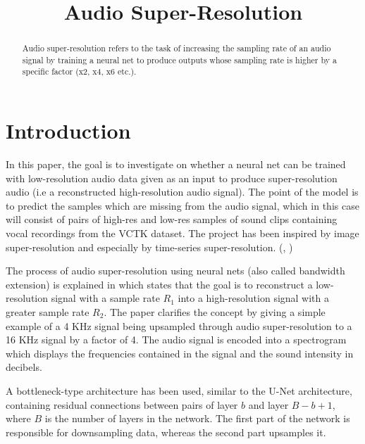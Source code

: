 \documentclass[conference]{IEEEtran}
\begin{document}
\title{Audio Super-Resolution\\
}

\author{
}

\maketitle

\begin{abstract}
Audio super-resolution refers to the task of increasing the sampling rate of an audio signal by training a neural net to produce outputs whose sampling rate is higher by a specific factor (x2, x4, x6 etc.).
\end{abstract}

\section{Introduction}
	In this paper, the goal is to investigate on whether a neural net can be trained with low-resolution audio data given as an input to produce super-resolution audio (i.e a reconstructed high-resolution audio signal). The point of the model is to predict the samples which are missing from the audio signal, which in this case will consist of pairs of high-res and low-res samples of sound clips containing vocal recordings from the VCTK dataset. The project has been inspired by image super-resolution and especially by time-series super-resolution. (\textcite{kuleshov2017audio}, \textcite{hetherly2017audio})

	The process of audio super-resolution using neural nets (also called bandwidth extension) is explained in \textcite{kuleshov2017audio} which states that the goal is to reconstruct a low-resolution signal with a sample rate $ R_{1} $ into a high-resolution signal with a greater sample rate $ R_{2} $. The paper clarifies the concept by giving a simple example of a 4 KHz signal being upsampled through audio super-resolution to a 16 KHz signal by a factor of 4. The audio signal is encoded into a spectrogram which displays the frequencies contained in the signal and the sound intensity in decibels. 

	A bottleneck-type architecture has been used, similar to the U-Net architecture, containing residual connections between pairs of layer $ b $ and layer $ B - b + 1 $, where $ B $ is the number of layers in the network. The first part of the network is responsible for downsampling data, whereas the second part upsamples it.
\end{document}
